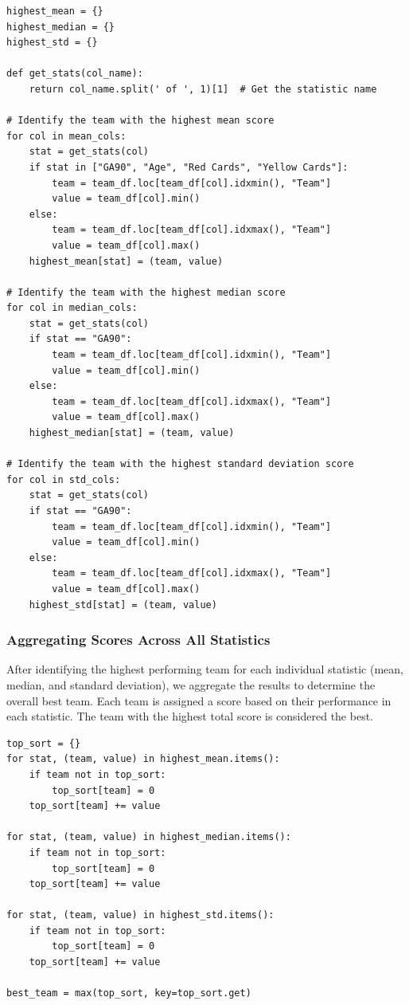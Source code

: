 \documentclass[a4paper,12pt]{article}
\begin{document}
\begin{verbatim}
highest_mean = {}
highest_median = {}
highest_std = {}

def get_stats(col_name):
    return col_name.split(' of ', 1)[1]  # Get the statistic name

# Identify the team with the highest mean score
for col in mean_cols:
    stat = get_stats(col)
    if stat in ["GA90", "Age", "Red Cards", "Yellow Cards"]:
        team = team_df.loc[team_df[col].idxmin(), "Team"]
        value = team_df[col].min()
    else:
        team = team_df.loc[team_df[col].idxmax(), "Team"]
        value = team_df[col].max()
    highest_mean[stat] = (team, value)

# Identify the team with the highest median score
for col in median_cols:
    stat = get_stats(col)
    if stat == "GA90":
        team = team_df.loc[team_df[col].idxmin(), "Team"]
        value = team_df[col].min()
    else:
        team = team_df.loc[team_df[col].idxmax(), "Team"]
        value = team_df[col].max()
    highest_median[stat] = (team, value)

# Identify the team with the highest standard deviation score
for col in std_cols:
    stat = get_stats(col)
    if stat == "GA90":
        team = team_df.loc[team_df[col].idxmin(), "Team"]
        value = team_df[col].min()
    else:
        team = team_df.loc[team_df[col].idxmax(), "Team"]
        value = team_df[col].max()
    highest_std[stat] = (team, value)
\end{verbatim}

\subsubsection{Aggregating Scores Across All Statistics}

After identifying the highest performing team for each individual statistic (mean, median, and standard deviation), we aggregate the results to determine the overall best team. Each team is assigned a score based on their performance in each statistic. The team with the highest total score is considered the best.

\begin{verbatim}
top_sort = {}
for stat, (team, value) in highest_mean.items():
    if team not in top_sort:
        top_sort[team] = 0
    top_sort[team] += value

for stat, (team, value) in highest_median.items():
    if team not in top_sort:
        top_sort[team] = 0
    top_sort[team] += value

for stat, (team, value) in highest_std.items():
    if team not in top_sort:
        top_sort[team] = 0
    top_sort[team] += value

best_team = max(top_sort, key=top_sort.get)
\end{verbatim}
\end{document}
